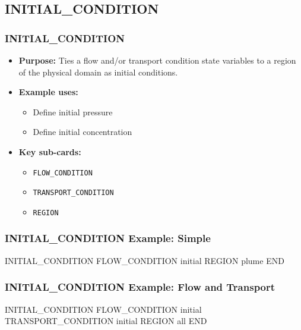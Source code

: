 \subsection{INITIAL\_CONDITION}

\begin{frame}\frametitle{INITIAL\_CONDITION}

\begin{itemize}
\item[] \textbf{Purpose:} Ties a flow and/or transport condition state variables to a region of the physical domain as initial conditions.
\item[] \textbf{Example uses:}
\begin{itemize}
  \item Define initial pressure
  \item Define initial concentration
\end{itemize}
\item[] \textbf{Key sub-cards:}
\begin{itemize}
  \item[] \verb|FLOW_CONDITION|
  \item[] \verb|TRANSPORT_CONDITION|
  \item[] \verb|REGION|
\end{itemize}
\end{itemize}

\end{frame}

\begin{frame}[fragile]\frametitle{INITIAL\_CONDITION Example: Simple}

\begin{semiverbatim}
INITIAL_CONDITION
  FLOW_CONDITION initial
  REGION plume
END
\end{semiverbatim}

\end{frame}


\begin{frame}[fragile]\frametitle{INITIAL\_CONDITION Example: Flow and Transport}

\begin{semiverbatim}
INITIAL_CONDITION
  FLOW_CONDITION initial
  TRANSPORT_CONDITION initial
  REGION all
END
\end{semiverbatim}

\end{frame}
